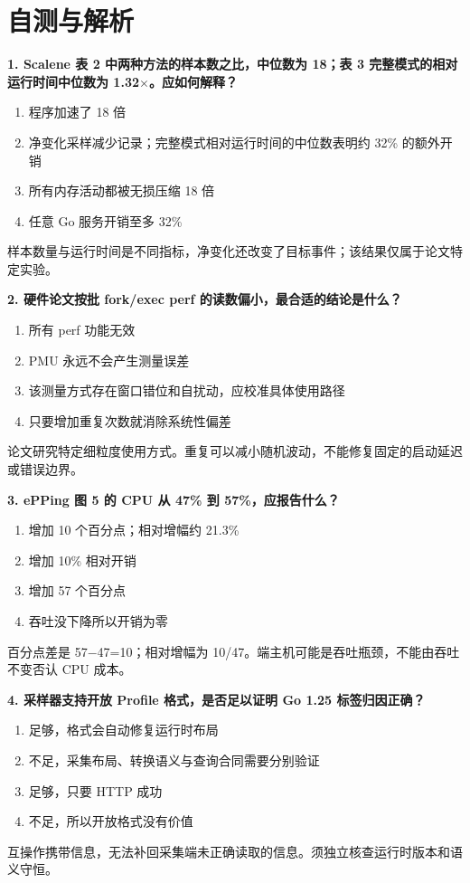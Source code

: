 \documentclass[UTF8,fontset=fandol,openany,11pt]{ctexbook}
\begin{document}
\section{自测与解析}
\noindent\textbf{1. Scalene 表 2 中两种方法的样本数之比，中位数为 18；表 3 完整模式的相对运行时间中位数为 1.32\ensuremath{\times}。应如何解释？}
\begin{enumerate}[label=\Alph*.]
\item 程序加速了 18 倍
\item 净变化采样减少记录；完整模式相对运行时间的中位数表明约 32\% 的额外开销
\item 所有内存活动都被无损压缩 18 倍
\item 任意 Go 服务开销至多 32\%
\end{enumerate}
样本数量与运行时间是不同指标，净变化还改变了目标事件；该结果仅属于论文特定实验。

\noindent\textbf{2. 硬件论文按批 fork/exec perf 的读数偏小，最合适的结论是什么？}
\begin{enumerate}[label=\Alph*.]
\item 所有 perf 功能无效
\item PMU 永远不会产生测量误差
\item 该测量方式存在窗口错位和自扰动，应校准具体使用路径
\item 只要增加重复次数就消除系统性偏差
\end{enumerate}
论文研究特定细粒度使用方式。重复可以减小随机波动，不能修复固定的启动延迟或错误边界。

\noindent\textbf{3. ePPing 图 5 的 CPU 从 47\% 到 57\%，应报告什么？}
\begin{enumerate}[label=\Alph*.]
\item 增加 10 个百分点；相对增幅约 21.3\%
\item 增加 10\% 相对开销
\item 增加 57 个百分点
\item 吞吐没下降所以开销为零
\end{enumerate}
百分点差是 57\ensuremath{-}47=10；相对增幅为 10/47。端主机可能是吞吐瓶颈，不能由吞吐不变否认 CPU 成本。

\noindent\textbf{4. 采样器支持开放 Profile 格式，是否足以证明 Go 1.25 标签归因正确？}
\begin{enumerate}[label=\Alph*.]
\item 足够，格式会自动修复运行时布局
\item 不足，采集布局、转换语义与查询合同需要分别验证
\item 足够，只要 HTTP 成功
\item 不足，所以开放格式没有价值
\end{enumerate}
互操作携带信息，无法补回采集端未正确读取的信息。须独立核查运行时版本和语义守恒。
\end{document}
